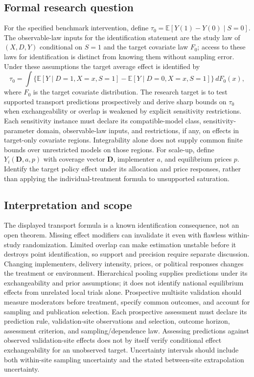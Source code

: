 \documentclass[11pt,a4paper]{article}
\begin{document}
\subsection*{Formal research question}
For the specified benchmark intervention, define $\tau_0=\mathbb E[Y(1)-Y(0)\mid S=0]$. The observable-law inputs for the identification statement are the study law of $(X,D,Y)$ conditional on $S=1$ and the target covariate law $F_0$; access to these laws for identification is distinct from knowing them without sampling error. Under these assumptions the target average effect is identified by
\[
 \tau_0=\int\!\bigl\{\mathbb E[Y\mid D=1,X=x,S=1]
                -\mathbb E[Y\mid D=0,X=x,S=1]\bigr\}\,dF_0(x),
\]
where $F_0$ is the target covariate distribution. The research target is to test supported transport predictions prospectively and derive sharp bounds on $\tau_0$ when exchangeability or overlap is weakened by explicit sensitivity restrictions. Each sensitivity instance must declare its compatible-model class, sensitivity-parameter domain, observable-law inputs, and restrictions, if any, on effects in target-only covariate regions. Integrability alone does not supply common finite bounds over unrestricted models on those regions. For scale-up, define $Y_i(\mathbf D,a,p)$ with coverage vector $\mathbf D$, implementer $a$, and equilibrium prices $p$. Identify the target policy effect under its allocation and price responses, rather than applying the individual-treatment formula to unsupported saturation.
\subsection*{Interpretation and scope}
The displayed transport formula is a known identification consequence, not an open theorem. Missing effect modifiers can invalidate it even with flawless within-study randomization. Limited overlap can make estimation unstable before it destroys point identification, so support and precision require separate discussion. Changing implementers, delivery intensity, prices, or political responses changes the treatment or environment. Hierarchical pooling supplies predictions under its exchangeability and prior assumptions; it does not identify national equilibrium effects from unrelated local trials alone. Prospective multisite validation should measure moderators before treatment, specify common outcomes, and account for sampling and publication selection. Each prospective assessment must declare its prediction rule, validation-site observations and selection, outcome horizon, assessment criterion, and sampling/dependence law. Assessing predictions against observed validation-site effects does not by itself verify conditional effect exchangeability for an unobserved target. Uncertainty intervals should include both within-site sampling uncertainty and the stated between-site extrapolation uncertainty.
\end{document}
